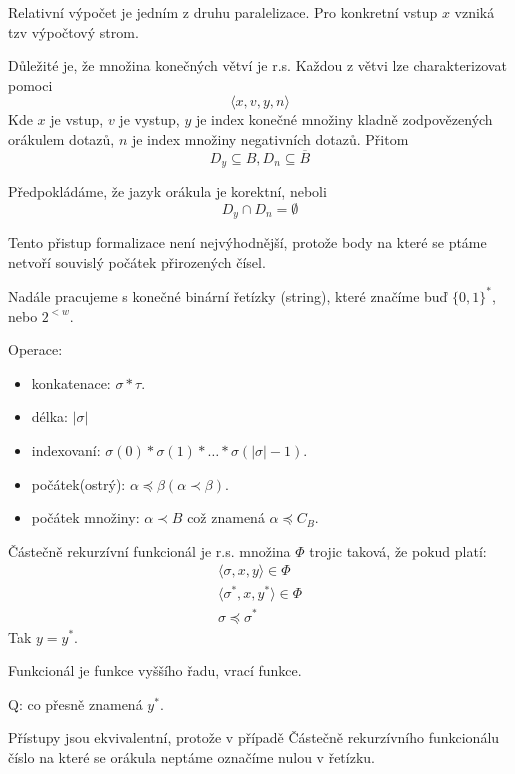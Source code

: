 \begin{note}
	Relativní výpočet je jedním z druhu paralelizace.
	Pro konkretní vstup $x$ vzniká tzv výpočtový strom.

	Důležité je, že množina konečných větví je r.s.
	Každou z větvi lze charakterizovat pomoci
	\[ \langle x, v, y, n \rangle \]
	Kde $x$ je vstup, $v$ je vystup, $y$ je index konečné množiny kladně zodpovězených orákulem dotazů, $n$ je index množiny negativních dotazů.
	Přitom
	\[ D_y \subseteq B, D_n \subseteq \overline{B} \]

	Předpokládáme, že jazyk orákula je korektní, neboli
	\[ D_y \cap D_n = \emptyset \]

	Tento přistup formalizace není nejvýhodnější, protože body na které se ptáme netvoří souvislý počátek přirozených čísel.
\end{note}

\begin{agreement}
	Nadále pracujeme s konečné binární řetízky (string), které značíme buď $\{ 0, 1 \}^{\ast}$, nebo $2^{<w}$.

	Operace:
	\begin{itemize}
		\item konkatenace: $\sigma * \tau$.
		\item délka: $|\sigma|$
		\item indexovaní: $\sigma(0) * \sigma(1) * \ldots * \sigma(|\sigma| - 1)$.
		\item počátek(ostrý): $\alpha \preccurlyeq \beta (\alpha \prec \beta)$.
		\item počátek množiny: $\alpha \prec B$ což znamená $\alpha \preccurlyeq C_B$.
	\end{itemize}
\end{agreement}

\begin{definition}
	Částečně rekurzívní funkcionál je r.s. množina $\Phi$ trojic taková, že pokud platí:
	\begin{gather*}
		\langle \sigma, x, y \rangle \in \Phi \\
		\langle \sigma^{\ast}, x, y^{\ast} \rangle \in \Phi \\
		\sigma \preccurlyeq \sigma^{\ast}
	\end{gather*}
	Tak $y = y^{\ast}$.

	Funkcionál je funkce vyššího řadu, vrací funkce.
\end{definition}
Q: co přesně znamená $y^{\ast}$.

\begin{note}
	Přístupy jsou ekvivalentní, protože v případě Částečně rekurzívního funkcionálu číslo na které se orákula neptáme označíme nulou v řetízku.
\end{note}

